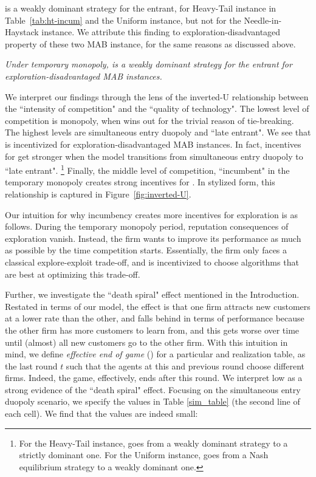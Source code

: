 \documentclass[../competing_bandits_with_appendix.tex]{subfiles}
\begin{document}
\DG is a weakly dominant strategy for the entrant, for Heavy-Tail instance in Table~\ref{tab:ht-incum} and the Uniform instance, but not for the Needle-in-Haystack instance. We attribute this finding to exploration-disadvantaged property of these two MAB instance, for the same reasons as discussed above.

\begin{finding}\label{find:temp-monopoly-entrant}
\textit{Under temporary monopoly, \DG is a weakly dominant strategy for the entrant for exploration-disadvantaged MAB instances.
}
\end{finding}

We interpret our findings through the lens of the inverted-U relationship between the ``intensity of competition" and the ``quality of technology". The lowest level of competition is monopoly, when \DG wins out for the trivial reason of tie-breaking. The highest levels are simultaneous entry duopoly and ``late entrant". We see that \DG is incentivized for exploration-disadvantaged MAB instances. In fact, incentives for \DG get stronger when the model transitions from simultaneous entry duopoly to ``late entrant".%
\footnote{For the Heavy-Tail instance, \DG goes from a weakly dominant strategy to a strictly dominant one. For the Uniform instance, \DG goes from a Nash equilibrium strategy to a weakly dominant one.}
Finally, the middle level of competition, ``incumbent" in the temporary monopoly creates strong incentives for \TS. In stylized form, this relationship is captured in Figure~\ref{fig:inverted-U}.


Our intuition for why incumbency creates more incentives for exploration is as follows. During the temporary monopoly period, reputation consequences of exploration vanish. Instead, the firm wants to improve its performance as much as possible by the time competition starts. Essentially, the firm only faces a classical explore-exploit trade-off, and is incentivized to choose algorithms that are best at optimizing this trade-off.

Further, we investigate the ``death spiral" effect mentioned in the Introduction. Restated in terms of our model, the effect is that one firm attracts new customers at a lower rate than the other, and falls behind in terms of performance because the other firm has more customers to learn from, and this gets worse over time until (almost) all new customers go to the other firm. With this intuition in mind, we define  \textit{effective end of game} (\Eeog) for a particular \MRV and realization table, as the last round $t$ such that the agents at this and previous round choose different firms. Indeed, the game, effectively, ends after this round. We interpret low \Eeog as a strong evidence of the ``death spiral" effect. Focusing on the simultaneous entry duopoly scenario, we specify the \Eeog values in Table \ref{sim_table} (the second line of each cell). We find that the \Eeog values are indeed small:
\end{document}
